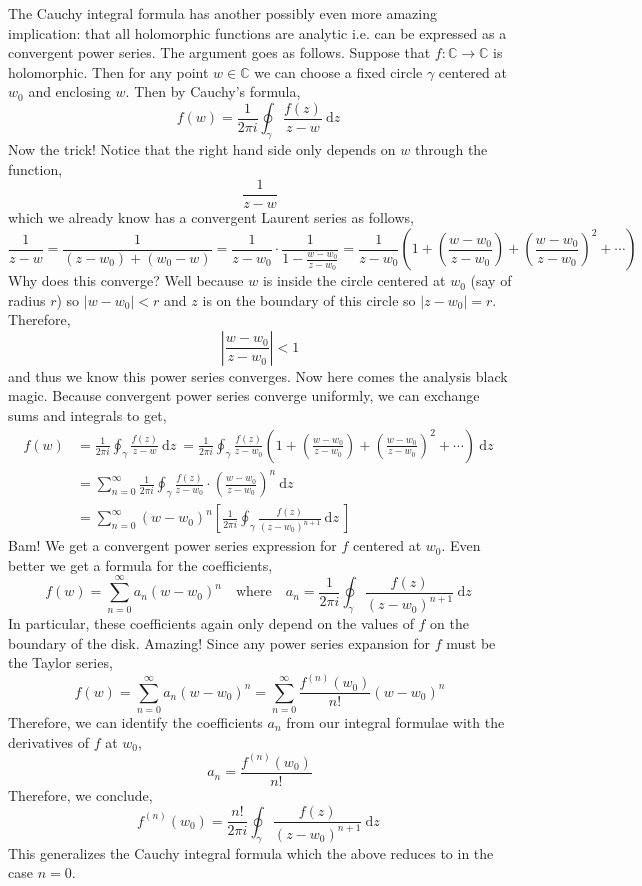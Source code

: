 \documentclass{article}
\newcommand{\C}{\mathbb{C}}
\renewcommand{\d}[1]{\: \mathrm{d}#1 \:}
\theoremstyle{definition}
\begin{document}
The Cauchy integral formula has another possibly even more amazing implication: that all holomorphic functions are analytic i.e. can be expressed as a convergent power series. The argument goes as follows. Suppose that $f : \C \to \C$ is holomorphic. Then for any point $w \in \C$ we can choose a fixed circle $\gamma$ centered at $w_0$ and enclosing $w$. Then by Cauchy's formula,
\[ f(w) = \frac{1}{2 \pi i} \oint_\gamma \frac{f(z)}{z - w} \d{z} \]
Now the trick! Notice that the right hand side only depends on $w$ through the function,
\[ \frac{1}{z - w}  \]
which we already know has a convergent Laurent series as follows,
\[ \frac{1}{z - w} = \frac{1}{(z - w_0) + (w_0 - w)} = \frac{1}{z - w_0} \cdot \frac{1}{1 - \frac{w - w_0}{z - w_0}} = \frac{1}{z - w_0} \left( 1 + \left( \frac{w - w_0}{z - w_0} \right) + \left( \frac{w - w_0}{z - w_0} \right)^2 + \cdots \right) \]
Why does this converge? Well because $w$ is inside the circle centered at $w_0$ (say of radius $r$) so $|w - w_0| < r$ and $z$ is on the boundary of this circle so $|z - w_0| = r$. Therefore,
\[ \left| \frac{w - w_0}{z - w_0} \right| < 1 \]
and thus we know this power series converges. Now here comes the analysis black magic. Because convergent power series converge uniformly, we can exchange sums and integrals to get,
\begin{align*}
f(w) & = \frac{1}{2 \pi i} \oint_\gamma \frac{f(z)}{z - w} \d{z} = \frac{1}{2 \pi i} \oint_{\gamma} \frac{f(z)}{z - w_0} \left( 1 + \left( \frac{w - w_0}{z - w_0} \right) + \left(\frac{w - w_0}{z - w_0} \right)^2 + \cdots \right)  \d{z} 
\\
& = \sum_{n = 0}^{\infty} \frac{1}{2 \pi i} \oint_{\gamma} \frac{f(z)}{z - w_0} \cdot \left( \frac{w - w_0}{z - w_0} \right)^{n} \d{z}
\\
& = \sum_{n = 0}^\infty (w - w_0)^n \left[ \frac{1}{2 \pi i} \oint_{\gamma} \frac{f(z)}{(z - w_0)^{n+1}} \d{z} \right] 
\end{align*}
Bam! We get a convergent power series expression for $f$ centered at $w_0$. Even better we get a formula for the coefficients,
\[ f(w) = \sum_{n = 0}^\infty a_n (w - w_0)^n \quad \text{where} \quad a_n = \frac{1}{2 \pi i} \oint_{\gamma} \frac{f(z)}{(z - w_0)^{n+1}} \d{z} \]
In particular, these coefficients again only depend on the values of $f$ on the boundary of the disk. Amazing! 
Since any power series expansion for $f$ must be the Taylor series,
\[ f(w) = \sum_{n = 0}^\infty a_n (w - w_0)^n = \sum_{n = 0}^\infty \frac{f^{(n)}(w_0)}{n!} (w - w_0)^n \]
Therefore, we can identify the coefficients $a_n$ from our integral formulae with the derivatives of $f$ at $w_0$,
\[ a_n = \frac{f^{(n)}(w_0)}{n!} \]
Therefore, we conclude,
\[ f^{(n)}(w_0) = \frac{n!}{2 \pi i} \oint_\gamma \frac{f(z)}{(z - w_0)^{n+1}} \d{z} \]
This generalizes the Cauchy integral formula which the above reduces to in the case $n = 0$.
\end{document}
